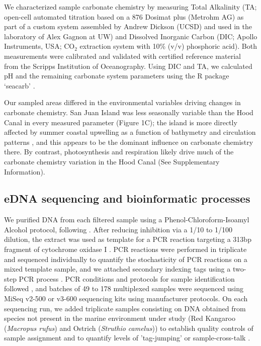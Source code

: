 \documentclass[11pt]{article}
\begin{document}
\begin{linenumbers}
We characterized sample carbonate chemistry by measuring Total Alkalinity (TA; open-cell automated titration based on a 876 Dosimat plus (Metrohm AG) as part of a custom system assembled by Andrew Dickson (UCSD) and used in the laboratory of Alex Gagnon at UW) and Dissolved Inorganic Carbon (DIC; Apollo Instruments, USA; CO$_2$ extraction system with 10\% (v/v) phosphoric acid). Both measurements were calibrated and validated with certified reference material from the Scripps Institution of Oceanography. Using DIC and TA, we calculated pH and the remaining carbonate system parameters using the R package `seacarb' \cite{seacarb}. 

Our sampled areas differed in the environmental variables driving changes in carbonate chemistry. San Juan Island was less seasonally variable than the Hood Canal in every measured parameter (Figure 1C); the island is more directly affected by summer coastal upwelling as a function of bathymetry and circulation patterns \cite{murray2015inland}, and this appears to be the dominant influence on carbonate chemistry there. By contrast, photosynthesis and respiration likely drive much of the carbonate chemistry variation in the Hood Canal (See Supplementary Information). 

\subsection*{eDNA sequencing and bioinformatic processes}
We purified DNA from each filtered sample using a Phenol-Chloroform-Isoamyl Alcohol protocol, following \cite{renshaw2015room}.  After reducing inhibition via a 1/10 to 1/100 dilution, the extract was used as template for a PCR reaction targeting a 313bp fragment of cytochrome oxidase I \cite{leray_new_2013}. PCR reactions were performed in triplicate and sequenced individually to quantify the stochasticity of PCR reactions on a mixed template sample, and we attached secondary indexing tags using a two-step PCR process \cite{odonnellPrimers}. PCR conditions and protocols for sample identification followed \cite{kelly2018tides}, and batches of 49 to 178 multiplexed samples were sequenced using MiSeq v2-500 or v3-600 sequencing kits using manufacturer protocols. On each sequencing run, we added triplicate samples consisting on DNA obtained from species not present in the marine environment under study (Red Kangaroo (\textit{Macropus rufus}) and Ostrich (\textit{Struthio camelus})) to establish quality controls of sample assignment and to quantify levels of 'tag-jumping' or sample-cross-talk \cite{schnell2015tag}. 


\end{linenumbers}
\end{document}
